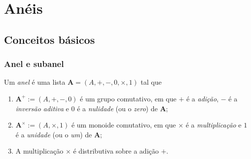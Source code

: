 \chapter{Anéis}

\section{Conceitos básicos}

\subsection{Anel e subanel}

\begin{definition}
Um \emph{anel} é uma lista $\bm A=(A,+,-,0,\times,1)$ tal que
	\begin{enumerate}
	\item $\bm A^+ := (A,+,-,0)$ é um grupo comutativo, em que $+$ é a \emph{adição}, $-$ é a \emph{inversão aditiva} e $0$ é a \emph{nulidade} (ou o \emph{zero}) de $\bm A$;
	\item $\bm A^\times := (A,\times,1)$ é um monoide comutativo, em que $\times$ é a \emph{multiplicação} e $1$ é a \emph{unidade} (ou o \emph{um}) de $\bm A$;
	\item A multiplicação $\times$ é distributiva sobre a adição $+$.
	\end{enumerate}
\end{definition}

